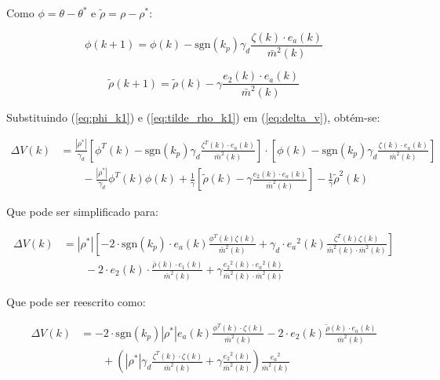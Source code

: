   Como $\phi = \theta - \theta^*$ e $\tilde{\rho} = \rho - \rho^*$:

  \begin{equation}
    \phi(k+1) = \phi(k) - \mathrm{sgn}(k_p) \gamma_d \frac{\zeta(k) \cdot e_a(k)}{{\bar{m}}^2(k)}
    \label{eq:phi_k1}
  \end{equation}

  \begin{equation}
    \tilde{\rho}(k+1) = \tilde{\rho}(k) - \gamma \frac{e_2(k) \cdot e_a(k)}{{\bar{m}}^2(k)}
    \label{eq:tilde_rho_k1}
  \end{equation}

  Substituindo (\ref{eq:phi_k1}) e (\ref{eq:tilde_rho_k1}) em (\ref{eq:delta_v}), obtém-se:

  \begin{equation}
    \begin{split}
      \Delta V(k) &= \frac{|\rho^*|}{\gamma_d} \left[ \phi^T(k) - \mathrm{sgn}(k_p) \gamma_d
          \frac{\zeta^T(k) \cdot e_a(k)}{{\bar{m}}^2(k)} \right] \cdot
          \left[ \phi(k) - \mathrm{sgn}(k_p) \gamma_d \frac{\zeta(k) \cdot e_a(k)}{{\bar{m}}^2(k)} \right] \\
          &\qquad {}- \frac{|\rho^*|}{\gamma_d} \phi^T(k) \phi(k) + \frac{1}{\gamma} \left[ \tilde{\rho}(k)
          - \gamma \frac{e_2(k) \cdot e_a(k)}{{\bar{m}}^2(k)} \right]
          - \frac{1}{\gamma} {\tilde{\rho}}^2(k)
    \end{split}
  \end{equation}

  Que pode ser simplificado para:

  \begin{equation*}
    \begin{split}
      \Delta V(k) &= |\rho^*| \left[ - 2 \cdot \mathrm{sgn}(k_p) \cdot e_a(k) \frac{\phi^T(k) \zeta(k)}{{\bar{m}}^2(k)}
      + \gamma_d \cdot {e_a}^2(k) \frac{\zeta^T(k) \zeta(k)}{{\bar{m}}^2(k) \cdot {\bar{m}}^2(k)} \right] \\
      &\qquad {}- 2 \cdot e_2(k) \cdot \frac{\bar{\rho}(k) \cdot e_1(k)}{{\bar{m}}^2(k)}
      + \gamma \frac{{e_2}^2(k) \cdot {e_a}^2(k)}{{\bar{m}}^2(k) \cdot {\bar{m}}^2(k)}
    \end{split}
  \end{equation*}

  Que pode ser reescrito como:

  \begin{equation*}
    \begin{split}
      \Delta V(k) &= -2 \cdot \mathrm{sgn}(k_p) |\rho^*| e_a(k) \frac{\phi^T(k) \cdot \zeta(k)}{{\bar{m}}^2(k)}
          -2 \cdot e_2(k) \frac{\tilde{\rho}(k) \cdot e_a(k)}{{\bar{m}}^2(k)} \\
          &\qquad {}+ \left( |\rho^*| \gamma_d \frac{\zeta^T(k) \cdot \zeta(k)}{{\bar{m}}^2(k)}
          + \gamma \frac{{e_2}^2(k)}{{\bar{m}}^2(k)} \right) \frac{{e_a}^2}{{\bar{m}}^2(k)}
    \end{split}
  \end{equation*}

